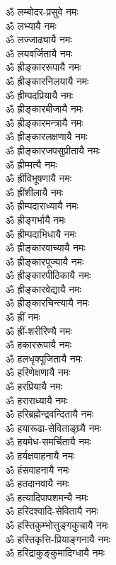 \begin{multicols}{2}
\begin{flushleft}
ॐ लम्बोदर-प्रसुवे नमः\\
ॐ लभ्यायै नमः\\
ॐ लज्जाढ्यायै नमः\\
ॐ लयवर्जितायै नमः\hfill {}\\
ॐ ह्रीङ्काररूपायै नमः\\
ॐ ह्रीङ्कारनिलयायै नमः\\
ॐ ह्रीम्पदप्रियायै नमः\\
ॐ ह्रीङ्कारबीजायै नमः\\
ॐ ह्रीङ्कारमन्त्रायै नमः\\
ॐ ह्रीङ्कारलक्षणायै नमः\\
ॐ ह्रीङ्कारजपसुप्रीतायै नमः\\
ॐ ह्रीम्मत्यै नमः\\
ॐ ह्रींविभूषणायै नमः\\
ॐ ह्रींशीलायै नमः\hfill {}\\
ॐ ह्रीम्पदाराध्यायै नमः\\
ॐ ह्रीङ्गर्भायै नमः\\
ॐ ह्रीम्पदाभिधायै नमः\\
ॐ ह्रीङ्कारवाच्यायै नमः\\
ॐ ह्रीङ्कारपूज्यायै नमः\\
ॐ ह्रीङ्कारपीठिकायै नमः\\
ॐ ह्रीङ्कारवेद्यायै नमः\\
ॐ ह्रीङ्कारचिन्त्यायै नमः\\
ॐ ह्रीं नमः\\
ॐ ह्रीं-शरीरिण्यै नमः\hfill {}\\
ॐ हकाररूपायै नमः\\
ॐ हलधृक्पूजितायै नमः\\
ॐ हरिणेक्षणायै नमः\\
ॐ हरप्रियायै नमः\\
ॐ हराराध्यायै नमः\\
ॐ हरिब्रह्मेन्द्रवन्दितायै नमः\\
ॐ हयारूढा-सेविताङ्घ्र्यै नमः\\
ॐ हयमेध-समर्चितायै नमः\\
ॐ हर्यक्षवाहनायै नमः\\
ॐ हंसवाहनायै नमः\hfill {}\\
ॐ हतदानवायै नमः\\
ॐ हत्यादिपापशमन्यै नमः\\
ॐ हरिदश्वादि-सेवितायै नमः\\
ॐ हस्तिकुम्भोत्तुङ्गकुचायै नमः\\
ॐ हस्तिकृत्ति-प्रियाङ्गनायै नमः\\
ॐ हरिद्राकुङ्कुमादिग्धायै नमः\\

\end{flushleft}
\end{multicols}
